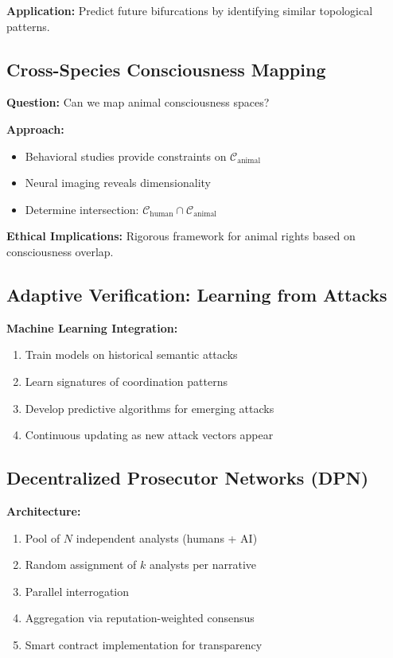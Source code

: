 \documentclass[11pt,a4paper]{article}
\theoremstyle{definition}
\theoremstyle{remark}
\newcommand{\CC}{\mathcal{C}}
\begin{document}
\begin{small}
\textbf{Application:} Predict future bifurcations by identifying similar topological patterns.

\subsection{Cross-Species Consciousness Mapping}

\textbf{Question:} Can we map animal consciousness spaces?

\textbf{Approach:}
\begin{itemize}
\item Behavioral studies provide constraints on $\CC_{\text{animal}}$
\item Neural imaging reveals dimensionality
\item Determine intersection: $\CC_{\text{human}} \cap \CC_{\text{animal}}$
\end{itemize}

\textbf{Ethical Implications:} Rigorous framework for animal rights based on consciousness overlap.

\subsection{Adaptive Verification: Learning from Attacks}

\textbf{Machine Learning Integration:}
\begin{enumerate}
\item Train models on historical semantic attacks
\item Learn signatures of coordination patterns
\item Develop predictive algorithms for emerging attacks
\item Continuous updating as new attack vectors appear
\end{enumerate}

\subsection{Decentralized Prosecutor Networks (DPN)}

\textbf{Architecture:}
\begin{enumerate}
\item Pool of $N$ independent analysts (humans + AI)
\item Random assignment of $k$ analysts per narrative
\item Parallel interrogation
\item Aggregation via reputation-weighted consensus
\item Smart contract implementation for transparency
\end{enumerate}


\end{small}
\end{document}
